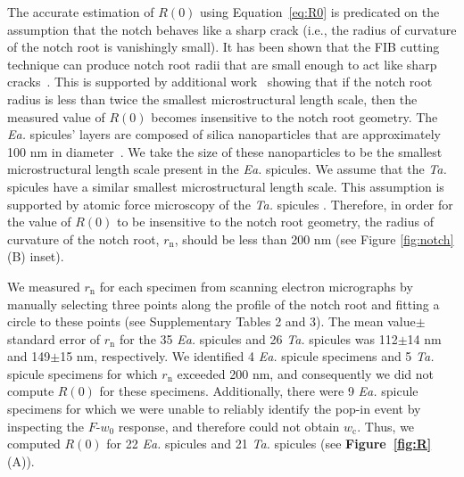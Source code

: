 \documentclass[12pt,onecolumn]{article}
\makeatletter
\newcommand{\TA}{\textit{Ta.\@}\xspace}
\newcommand{\EA}{\textit{Ea.\@}\xspace}
\makeatother
\begin{document}
\begin{bibunit}
The accurate estimation of $R(0)$ using Equation~\eqref{eq:R0} is predicated on the assumption that the notch behaves like a sharp crack (i.e., the radius of curvature of the notch root is vanishingly small). It has been shown that the FIB cutting technique can produce notch root radii that are small enough to act like sharp cracks~\cite{fett2008fracture}. This is supported by additional work~\cite{kubler1997fracture} showing that if the notch root radius is less than twice the smallest microstructural length scale, then the measured value of $R(0)$ becomes insensitive to the notch root geometry. The \EA spicules' layers are composed of silica nanoparticles that are approximately 100 nm in diameter~\cite{aizenberg2005skeleton}. We take the size of these nanoparticles to be the smallest microstructural length scale present in the \EA spicules. We assume that the \TA spicules have a similar smallest microstructural length scale. This assumption is supported by atomic force microscopy of the \TA spicules \cite{weaver2003nanostructural}. Therefore, in order for the value of $R(0)$ to be insensitive to the notch root geometry, the radius of curvature of the notch root, $r_\mathrm{n}$, should be less than 200 nm (see Figure \ref{fig:notch} (B) inset). 

We measured $r_\mathrm{n}$ for each specimen from scanning electron micrographs by manually selecting three points along the profile of the notch root and fitting a circle to these points (see Supplementary Tables 2 and 3). The mean value$\pm$standard error of $r_\mathrm{n}$ for the 35 \EA spicules and 26 \TA spicules was 112$\pm$14 nm and 149$\pm$15 nm, respectively. We identified 4 \EA spicule specimens and 5 \TA spicule specimens for which $r_\mathrm{n}$ exceeded 200 nm, and consequently we did not compute $R(0)$ for these specimens. Additionally, there were 9 \EA spicule specimens for which we were unable to reliably identify the pop-in event by inspecting the $F$-$w_0$ response, and therefore could not obtain $w_\mathrm{c}$. Thus, we computed $R(0)$ for 22 \EA spicules and 21 \TA spicules (see {\bf Figure~\ref{fig:R}} (A)).


\end{bibunit}
\end{document}
